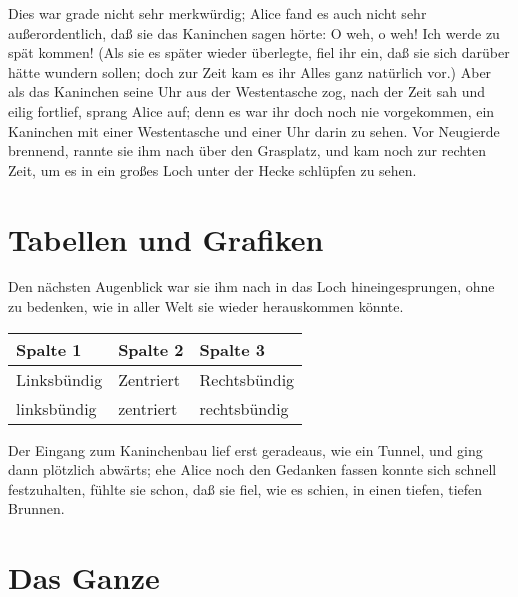 \documentclass[DIV=calc,10pt,parskip=half,twocolumn]{scrartcl}
\begin{document}
Dies war grade nicht sehr merkwürdig; Alice fand es auch nicht sehr
außerordentlich, daß sie das Kaninchen sagen hörte: \grqq{} O weh, o weh! Ich werde zu
spät kommen!\grqq{}  (Als sie es später wieder überlegte, fiel ihr ein, daß sie sich
darüber hätte wundern sollen; doch zur Zeit kam es ihr Alles ganz natürlich
vor.) Aber als das Kaninchen seine Uhr aus der Westentasche zog, nach der Zeit
sah und eilig fortlief, sprang Alice auf; denn es war ihr doch noch nie
vorgekommen, ein Kaninchen mit einer Westentasche und einer Uhr darin zu sehen.
Vor Neugierde brennend, rannte sie ihm nach über den Grasplatz, und kam noch
zur rechten Zeit, um es in ein großes Loch unter der Hecke schlüpfen zu sehen.




\section{Tabellen und Grafiken}

Den nächsten Augenblick war sie ihm nach in das Loch hineingesprungen, ohne zu
bedenken, wie in aller Welt sie wieder herauskommen könnte.

\begin{center}
\begin{tabular}{lll}
  \toprule
   Spalte 1 &  Spalte 2 & Spalte 3\\
   \midrule
   Linksbündig & Zentriert & Rechtsbündig\\
   linksbündig & zentriert & rechtsbündig\\
   \bottomrule
\end{tabular}
\end{center}

Der Eingang zum Kaninchenbau lief erst geradeaus, wie ein Tunnel, und ging dann
plötzlich abwärts; ehe Alice noch den Gedanken fassen konnte sich schnell
festzuhalten, fühlte sie schon, daß sie fiel, wie es schien, in einen tiefen,
tiefen Brunnen.




\clearpage


\section{Das Ganze}
\end{document}
